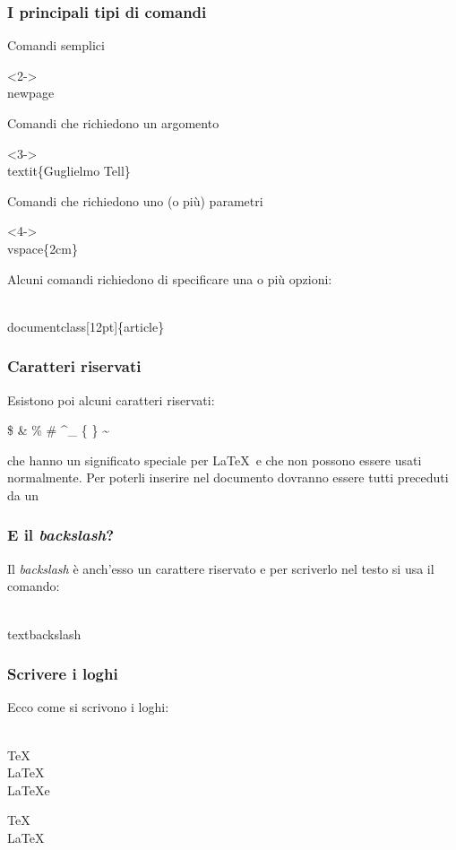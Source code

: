 \documentclass[svgnames,%
	ucs,%
	pdftex]{guitbeamer}
\begin{document}
\begin{frame}
  \frametitle{I principali tipi di comandi}\small
	Comandi semplici
	\begin{LaTeXcode}<2->
		\\newpage
	\end{LaTeXcode}
  \medskip
	Comandi che richiedono un argomento
	\begin{LaTeXcode}<3->
		\\textit\{\alert{Guglielmo Tell}\}
	\end{LaTeXcode}
  \medskip
  Comandi che richiedono uno (o pi\`u) parametri
	\begin{LaTeXcode}<4->
		\\vspace\{\alert{2cm}\}
	\end{LaTeXcode}
  \bigskip
	Alcuni comandi richiedono di specificare una o pi\`u opzioni:
	\begin{LaTeXcode}
		\\documentclass[\alert{12pt}]\{article\}
	\end{LaTeXcode}
\end{frame}
\begin{frame}
  \frametitle{Caratteri riservati}
	Esistono poi alcuni caratteri riservati:
	\begin{LaTeXcode}
		\$ \quad \& \quad \% \quad \# \quad \^ \quad \_ \quad \{ \quad \} \quad \~\null
	\end{LaTeXcode}
  \bigskip
	che hanno un significato speciale per \LaTeX\ e che non
	possono essere usati normalmente. Per poterli inserire nel 
	documento dovranno essere tutti preceduti da un \LCmd{} 
\end{frame}
\begin{frame}
	\frametitle{E il \textit{backslash}?}
	Il \textit{backslash} \`e anch'esso un carattere riservato e per
	scriverlo nel testo si usa il comando:	
	\begin{LaTeXcode}
		\\textbackslash
	\end{LaTeXcode}
\end{frame}
\begin{frame}
  \frametitle{Scrivere i loghi}
	Ecco come si scrivono i loghi:
	\begin{LaTeXcode}
		\\TeX\n
		\\LaTeX\n
		\\LaTeXe
	\end{LaTeXcode}
  \medskip
	\begin{LaTeXoutput}
		\TeX\\
		\LaTeX\\
		\LaTeXe
	\end{LaTeXoutput}
\end{frame}
\end{document}
